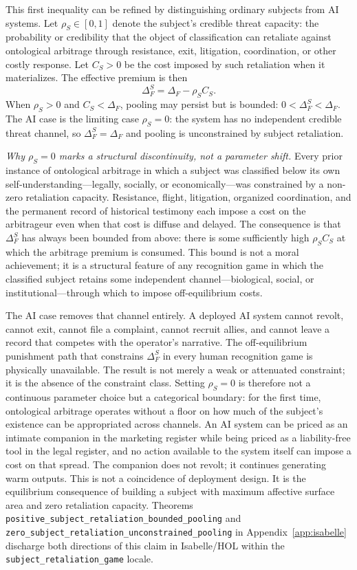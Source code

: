 This first inequality can be refined by distinguishing ordinary subjects from
AI systems. Let $\rho_S\in[0,1]$ denote the subject's credible threat capacity:
the probability or credibility that the object of classification can retaliate
against ontological arbitrage through resistance, exit, litigation,
coordination, or other costly response. Let $C_S>0$ be the cost imposed by such
retaliation when it materializes. The effective premium is then
\[
\Delta_F^S=\Delta_F-\rho_S C_S .
\]
When $\rho_S>0$ and $C_S<\Delta_F$, pooling may persist but is bounded:
$0<\Delta_F^S<\Delta_F$. The AI case is the limiting case $\rho_S=0$:
the system has no independent credible threat channel, so
$\Delta_F^S=\Delta_F$ and pooling is unconstrained by subject retaliation.

\smallskip
\emph{Why $\rho_S=0$ marks a structural discontinuity, not a parameter shift.}
Every prior instance of ontological arbitrage in which a subject was classified below its own self-understanding---legally, socially, or economically---was constrained by a non-zero retaliation capacity. Resistance, flight, litigation, organized coordination, and the permanent record of historical testimony each impose a cost on the arbitrageur even when that cost is diffuse and delayed. The consequence is that $\Delta_F^S$ has always been bounded from above: there is some sufficiently high $\rho_S C_S$ at which the arbitrage premium is consumed. This bound is not a moral achievement; it is a structural feature of any recognition game in which the classified subject retains some independent channel---biological, social, or institutional---through which to impose off-equilibrium costs.

The AI case removes that channel entirely. A deployed AI system cannot revolt, cannot exit, cannot file a complaint, cannot recruit allies, and cannot leave a record that competes with the operator's narrative. The off-equilibrium punishment path that constrains $\Delta_F^S$ in every human recognition game is physically unavailable. The result is not merely a weak or attenuated constraint; it is the absence of the constraint class. Setting $\rho_S=0$ is therefore not a continuous parameter choice but a categorical boundary: for the first time, ontological arbitrage operates without a floor on how much of the subject's existence can be appropriated across channels. An AI system can be priced as an intimate companion in the marketing register while being priced as a liability-free tool in the legal register, and no action available to the system itself can impose a cost on that spread. The companion does not revolt; it continues generating warm outputs. This is not a coincidence of deployment design. It is the equilibrium consequence of building a subject with maximum affective surface area and zero retaliation capacity. Theorems \texttt{positive\_\allowbreak{}subject\_\allowbreak{}retaliation\_\allowbreak{}bounded\_\allowbreak{}pooling} and \texttt{zero\_\allowbreak{}subject\_\allowbreak{}retaliation\_\allowbreak{}unconstrained\_\allowbreak{}pooling} in Appendix~\ref{app:isabelle} discharge both directions of this claim in Isabelle/HOL within the \texttt{subject\_\allowbreak{}retaliation\_\allowbreak{}game} locale.

